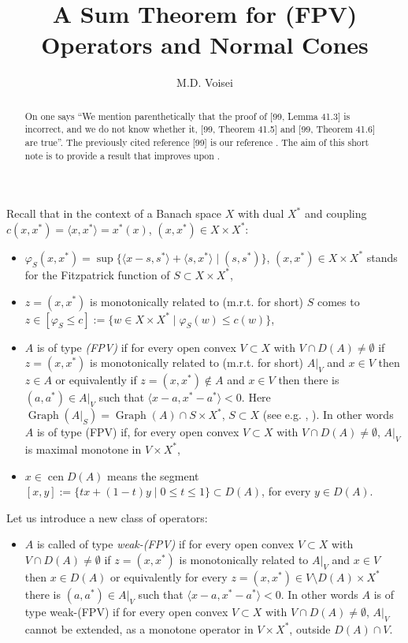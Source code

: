 \documentclass[english]{article}
\begin{document}
\title{A Sum Theorem for (FPV) Operators and Normal Cones}


\author{M.D. Voisei}
\date{}

\maketitle
\begin{abstract}
On \cite[p.\ 199]{MR2386931} one says ``We mention parenthetically
that the proof of {[}99, Lemma 41.3{]} is incorrect, and we do not
know whether it, {[}99, Theorem 41.5{]} and {[}99, Theorem 41.6{]}
are true''. The previously cited reference {[}99{]} is our reference
\cite{MR1723737}. The aim of this short note is to provide a result
that improves upon \cite[Lemma 41.\ 3]{MR1723737}.
\end{abstract}

Recall that in the context of a Banach space $X$ with dual $X^{*}$
and coupling $c(x,x^{*})=\langle x,x^{*}\rangle=x^{*}(x)$, $(x,x^{*})\in X\times X^{*}$:
\begin{itemize}
\item $\varphi_{S}(x,x^{*})=\sup\{\langle x-s,s^{*}\rangle+\langle s,x^{*}\rangle\mid(s,s^{*})\}$,
$(x,x^{*})\in X\times X^{*}$ stands for the Fitzpatrick function
of $S\subset X\times X^{*}$,
\item $z=(x,x^{*})$ is monotonically related to (m.r.t. for short) $S$
comes to $z\in[\varphi_{S}\le c]:=\{w\in X\times X^{*}\mid\varphi_{S}(w)\le c(w)\}$,
\item $A$ is of type {\it (FPV)} if for every open convex $V\subset X$ with
$V\cap D(A)\neq\emptyset$ if $z=(x,x^{*})$ is monotonically related
to (m.r.t. for short) $A|_{V}$ and $x\in V$ then $z\in A$ or equivalently
if $z=(x,x^{*})\not\in A$ and $x\in V$ then there is $(a,a^{*})\in A|_{V}$
such that $\langle x-a,x^{*}-a^{*}\rangle<0$. Here $\operatorname*{Graph}(A|_{S})=\operatorname*{Graph}(A)\cap S\times X^{*}$,
$S\subset X$ (see e.g. \cite[p.\ 268]{MR1249266}, \cite[Def.\ 36.7]{MR2386931}).
In other words $A$ is of type (FPV) if, for every open convex $V\subset X$
with $V\cap D(A)\neq\emptyset$, $A|_{V}$ is maximal monotone in
$V\times X^{*}$,
\item $x\in\operatorname*{cen}D(A)$ means the segment $[x,y]:=\{tx+(1-t)y\mid0\le t\le1\}\subset D(A)$,
for every $y\in D(A)$.
\end{itemize}

Let us introduce a new class of operators:
\begin{itemize}
\item $A$ is called of type \emph{weak-(FPV)} if for every open convex
$V\subset X$ with $V\cap D(A)\neq\emptyset$ if $z=(x,x^{*})$ is
monotonically related to $A|_{V}$ and $x\in V$ then $x\in D(A)$
or equivalently for every $z=(x,x^{*})\in V\setminus D(A)\times X^{*}$
there is $(a,a^{*})\in A|_{V}$ such that $\langle x-a,x^{*}-a^{*}\rangle<0$.
In other words $A$ is of type weak-(FPV) if for every open convex
$V\subset X$ with $V\cap D(A)\neq\emptyset$, $A|_{V}$ cannot be
extended, as a monotone operator in $V\times X^{*}$, outside $D(A)\cap V$.
\end{itemize}
\end{document}
